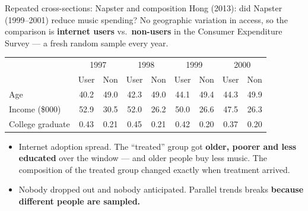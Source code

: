 \documentclass[
  11pt,
  ignorenonframetext,
  aspectratio=169,
]{beamer}
\providecommand{\tightlist}{%
  \setlength{\itemsep}{0pt}\setlength{\parskip}{0pt}}
\begin{document}
\begin{frame}{Repeated cross-sections: Napster and composition}
\protect{}\label{repeated-cross-sections-napster-and-composition}
Hong (2013): did Napster (1999--2001) reduce music spending? No
geographic variation in access, so the comparison is \textbf{internet
users} vs.~\textbf{non-users} in the Consumer Expenditure Survey --- a
fresh random sample every year.

\begin{center}\small
\begin{tabular}{lcccccccc}
\toprule
 & \multicolumn{2}{c}{1997} & \multicolumn{2}{c}{1998} & \multicolumn{2}{c}{1999} & \multicolumn{2}{c}{2000} \\
 & User & Non & User & Non & User & Non & User & Non \\
\midrule
Age & 40.2 & 49.0 & 42.3 & 49.0 & 44.1 & 49.4 & 44.3 & 49.9 \\
Income (\$000) & 52.9 & 30.5 & 52.0 & 26.2 & 50.0 & 26.6 & 47.5 & 26.3 \\
College graduate & 0.43 & 0.21 & 0.45 & 0.21 & 0.42 & 0.20 & 0.37 & 0.20 \\
\bottomrule
\end{tabular}
\end{center}

\begin{itemize}
\tightlist
\item
  Internet adoption spread. The ``treated'' group got \textbf{older,
  poorer and less educated} over the window --- and older people buy
  less music. The composition of the treated group changed exactly when
  treatment arrived.
\item
  Nobody dropped out and nobody anticipated. Parallel trends breaks
  \textbf{because different people are sampled.}
\end{itemize}
\end{frame}
\end{document}
